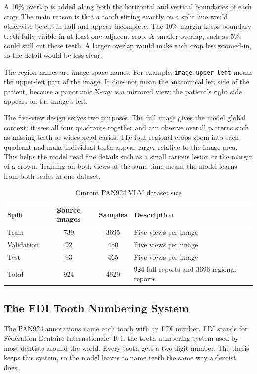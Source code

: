 \documentclass[a4paper,12pt]{report}
\begin{document}
A 10\% overlap is added along both the horizontal and vertical boundaries of each crop. The main reason is that a tooth sitting exactly on a split line would otherwise be cut in half and appear incomplete. The 10\% margin keeps boundary teeth fully visible in at least one adjacent crop. A smaller overlap, such as 5\%, could still cut these teeth. A larger overlap would make each crop less zoomed-in, so the detail would be less clear.

The region names are image-space names. For example, \texttt{image\_upper\_left} means the upper-left part of the image. It does not mean the anatomical left side of the patient, because a panoramic X-ray is a mirrored view: the patient's right side appears on the image's left.

The five-view design serves two purposes. The full image gives the model global context: it sees all four quadrants together and can observe overall patterns such as missing teeth or widespread caries. The four regional crops zoom into each quadrant and make individual teeth appear larger relative to the image area. This helps the model read fine details such as a small carious lesion or the margin of a crown. Training on both views at the same time means the model learns from both scales in one dataset.

\begin{table}[H]
\centering
\caption{Current PAN924 VLM dataset size}
\begin{tabular}{lccp{5.2cm}}
\toprule
Split & Source images & Samples & Description \\
\midrule
Train & 739 & 3695 & Five views per image \\
Validation & 92 & 460 & Five views per image \\
Test & 93 & 465 & Five views per image \\
\midrule
Total & 924 & 4620 & 924 full reports and 3696 regional reports \\
\bottomrule
\end{tabular}
\end{table}




\subsection{The FDI Tooth Numbering System}

The PAN924 annotations name each tooth with an FDI number. FDI stands for F\'ed\'eration Dentaire Internationale. It is the tooth numbering system used by most dentists around the world. Every tooth gets a two-digit number. The thesis keeps this system, so the model learns to name teeth the same way a dentist does.
\end{document}
